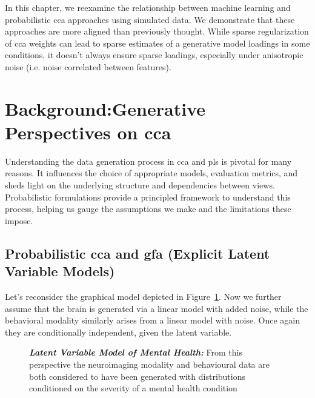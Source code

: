 In this chapter, we reexamine the relationship between machine learning and probabilistic \acrshort{cca} approaches using simulated data.
We demonstrate that these approaches are more aligned than previously thought.
While sparse regularization of \acrshort{cca} weights can lead to sparse estimates of a generative model \gls{loadings} in some conditions, it doesn't always ensure sparse loadings, especially under anisotropic noise (i.e. noise correlated between features).

\section{Background:Generative Perspectives on \acrshort{cca}}

Understanding the data generation process in \acrshort{cca} and \acrshort{pls} is pivotal for many reasons.
It influences the choice of appropriate models, evaluation metrics, and sheds light on the underlying structure and dependencies between views.
Probabilistic formulations provide a principled framework to understand this process, helping us gauge the assumptions we make and the limitations these impose.

\subsection{Probabilistic \acrshort{cca} and \acrshort{gfa} (Explicit Latent Variable Models)}\label{subsubsec:a-probabilistic-latent-variable-perspective}

Let's reconsider the graphical model depicted in Figure~\ref{fig:mentalhealthselfsupervisedrepeat}.
Now we further assume that the brain is generated via a linear model with added noise, while the behavioral modality similarly arises from a linear model with noise.
Once again they are conditionally independent, given the latent variable.

\begin{figure}
    \centering
    \caption[Latent Variable Model of Mental Health]{\textit{\textbf{Latent Variable Model of Mental Health:}} From this perspective the neuroimaging modality and behavioural data are both considered to have been generated with distributions conditioned on the severity of a mental health condition}\label{fig:mentalhealthselfsupervisedrepeat}
\end{figure}

